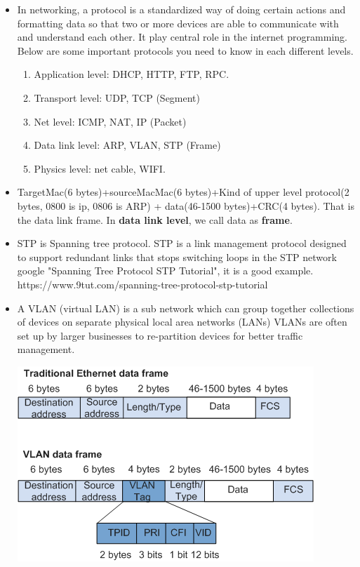 \documentclass[a4paper,11pt,twoside]{book}
\begin{document}
\begin{itemize}
	\item In networking, a protocol is a standardized way of doing certain actions and formatting data so that two or more devices are able to communicate with and understand each other. It play central role in the internet programming. Below are some important protocols you need to know in each different levels.
	\begin{enumerate}
		\item Application level: DHCP, HTTP, FTP, RPC.
		\item Transport  level: UDP, TCP (Segment)
		\item Net level: ICMP,  NAT, IP (Packet)
		\item Data link level: ARP, VLAN, STP (Frame)
		\item Physics level: net cable, WIFI. 
	\end{enumerate}

	\item TargetMac(6 bytes)+sourceMacMac(6 bytes)+Kind of upper level protocol(2 bytes, 0800 is ip, 0806 is ARP) + data(46-1500 bytes)+CRC(4 bytes). That is the data link frame. In \textbf{data link level}, we call data as \textbf{frame}. 

	\item STP is Spanning tree protocol. STP is a link management protocol designed to support redundant links that stops switching loops in the STP network google "Spanning Tree Protocol STP Tutorial", it is a good example.
https://www.9tut.com/spanning-tree-protocol-stp-tutorial

	\item A VLAN (virtual LAN) is a sub network which can group together collections of devices on separate physical local area networks (LANs) VLANs are often set up by larger businesses to re-partition devices for better traffic management.

\begin{center}
	\includegraphics[width=0.60\linewidth]{pics/vlan.png}
\end{center}


\end{itemize}
\end{document}
